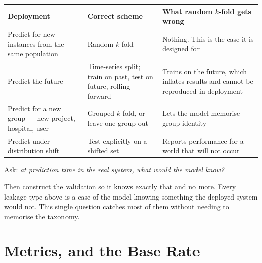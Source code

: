 \begin{center}
\small
\begin{tabular}{@{}L{3.4cm}L{5.0cm}L{5.9cm}@{}}
\toprule
\textbf{Deployment} & \textbf{Correct scheme} & \textbf{What random $k$-fold gets wrong} \\
\midrule
Predict for new instances from the same population
  & Random $k$-fold
  & Nothing. This is the case it is designed for \\
Predict the future
  & Time-series split; train on past, test on future, rolling forward
  & Trains on the future, which inflates results and cannot be reproduced in
    deployment \\
Predict for a new group --- new project, hospital, user
  & Grouped $k$-fold, or leave-one-group-out
  & Lets the model memorise group identity \\
Predict under distribution shift
  & Test explicitly on a shifted set
  & Reports performance for a world that will not occur \\
\bottomrule
\end{tabular}
\end{center}

\begin{alertbox}
Ask: \emph{at prediction time in the real system, what would the model know?}

\medskip
Then construct the validation so it knows exactly that and no more. Every
leakage type above is a case of the model knowing something the deployed system
would not. This single question catches most of them without needing to
memorise the taxonomy.
\end{alertbox}

\section{Metrics, and the Base Rate}

